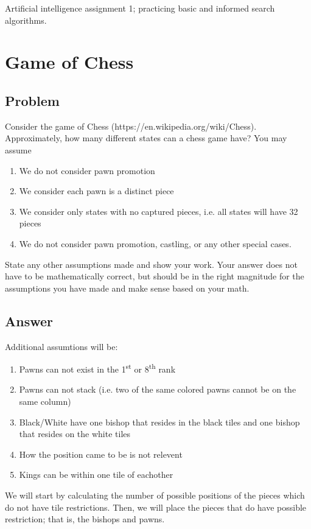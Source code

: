 \documentclass[11pt]{article}
\begin{document}
\begin{flushleft}
Artificial intelligence assignment 1; practicing basic and informed search 
algorithms.

\section*{Game of Chess}

\subsection*{Problem}
Consider the game of Chess (https://en.wikipedia.org/wiki/Chess). Approximately,
how many different states can a chess game have? You may assume

\begin{enumerate}
    \item We do not consider pawn promotion
    \item We consider each pawn is a distinct piece
    \item We consider only states with no captured pieces, i.e. all states will
        have 32 pieces
    \item We do not consider pawn promotion, castling, or any other special
        cases.
\end{enumerate}

State any other assumptions made and show your work. Your answer does not have 
to be mathematically correct, but should be in the right magnitude for the 
assumptions you have made and make sense based on your math.

\subsection*{Answer}

Additional assumtions will be:
\begin{enumerate}
    \item Pawns can not exist in the 1\textsuperscript{st} or 
        8\textsuperscript{th} rank
    \item Pawns can not stack (i.e. two of the same colored pawns cannot be on
        the same column)
    \item Black/White have one bishop that resides in the black tiles and
        one bishop that resides on the white tiles
    \item How the position came to be is not relevent
    \item Kings can be within one tile of eachother
\end{enumerate}
We will start by calculating the number of possible positions of the pieces
which do not have tile restrictions. Then, we will place the pieces that do have
possible restriction; that is, the bishops and pawns.


\end{flushleft}
\end{document}
